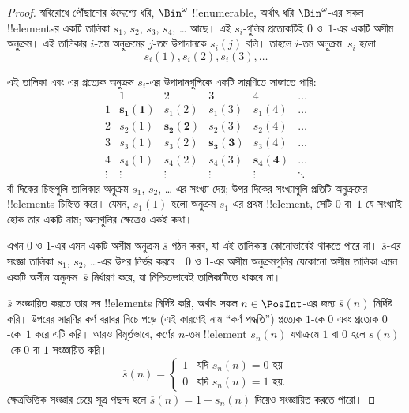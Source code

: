 \documentclass[../../../include/open-logic-section]{subfiles}
\begin{document}
\begin{proof}
স্ববিরোধে পৌঁছানোর উদ্দেশ্যে ধরি, $\Bin^\omega$ !!{enumerable}, অর্থাৎ ধরি $\Bin^\omega$-এর সকল !!{element}sর একটি তালিকা $s_{1}$, $s_{2}$, $s_{3}$, $s_{4}$, \dots{} আছে। এই $s_i$-গুলির প্রত্যেকটিই $0$ ও~$1$-এর একটি অসীম অনুক্রম। এই তালিকার $i$-তম অনুক্রমের $j$-তম উপাদানকে $s_i(j)$ বলি। তাহলে $i$-তম অনুক্রম~$s_i$ হলো
\[
s_i(1), s_i(2), s_i(3), \dots
\]

এই তালিকা এবং এর প্রত্যেক অনুক্রম $s_i$-এর উপাদানগুলিকে একটি সারণিতে সাজাতে পারি:
\[
\begin{array}{c|c|c|c|c|c}
& 1 & 2 & 3 & 4 & \dots \\\hline
1 & \mathbf{s_{1}(1)} & s_{1}(2) & s_{1}(3) & s_1(4) & \dots \\\hline
2 & s_{2}(1)& \mathbf{s_{2}(2)} & s_2(3) & s_2(4) & \dots \\\hline
3 & s_{3}(1)& s_{3}(2) & \mathbf{s_3(3)} & s_3(4) & \dots \\\hline
4 & s_{4}(1)& s_{4}(2) & s_4(3) & \mathbf{s_4(4)} & \dots \\\hline
\vdots & \vdots & \vdots & \vdots & \vdots & \mathbf{\ddots}
\end{array}
\]
বাঁ দিকের চিহ্নগুলি তালিকার অনুক্রম $s_1$, $s_2$, \dots-এর সংখ্যা দেয়; উপর দিকের সংখ্যাগুলি প্রতিটি অনুক্রমের !!{element}s চিহ্নিত করে। যেমন, $s_{1}(1)$ হলো অনুক্রম $s_{1}$-এর প্রথম !!{element}, সেটি $0$ বা~$1$ যে সংখ্যাই হোক তার একটি নাম; অন্যগুলির ক্ষেত্রেও একই কথা।

এখন $0$ ও $1$-এর এমন একটি অসীম অনুক্রম $\overline{s}$ গঠন করব, যা এই তালিকায় কোনোভাবেই থাকতে পারে না। $\overline{s}$-এর সংজ্ঞা তালিকা $s_1$, $s_2$, \dots-এর উপর নির্ভর করবে। $0$ ও $1$-এর অসীম অনুক্রমগুলির যেকোনো অসীম তালিকা এমন একটি অসীম অনুক্রম~$\overline{s}$ নির্ধারণ করে, যা নিশ্চিতভাবেই তালিকাটিতে থাকবে না।

$\overline{s}$ সংজ্ঞায়িত করতে তার সব !!{element}s নির্দিষ্ট করি, অর্থাৎ সকল $n \in \PosInt$-এর জন্য $\overline{s}(n)$ নির্দিষ্ট করি। উপরের সারণির কর্ণ বরাবর নিচে পড়ে (এই কারণেই নাম ``কর্ণ পদ্ধতি'') প্রত্যেক $1$-কে $0$ এবং প্রত্যেক $0$-কে~$1$ করে এটি করি। আরও বিমূর্তভাবে, কর্ণের $n$-তম !!{element} $s_n(n)$ যথাক্রমে $1$ বা $0$ হলে $\overline{s}(n)$-কে $0$ বা $1$ সংজ্ঞায়িত করি।
\[
\overline{s}(n) =
\begin{cases}
1 & \text{যদি $s_{n}(n) = 0$ হয়}\\
0 & \text{যদি $s_{n}(n) = 1$ হয়}.
\end{cases}
\]
ক্ষেত্রভিত্তিক সংজ্ঞার চেয়ে সূত্র পছন্দ হলে $\overline{s}(n) = 1 - s_n(n)$ দিয়েও সংজ্ঞায়িত করতে পারো।


\end{proof}
\end{document}
